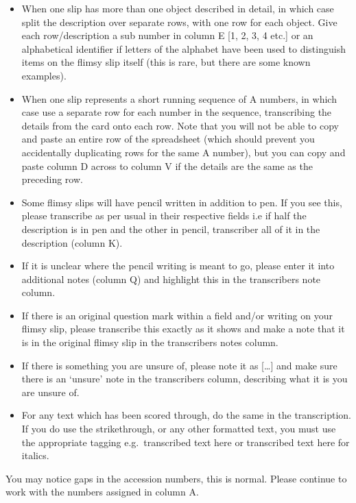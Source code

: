 \documentclass[
  openany]{book}
\providecommand{\tightlist}{%
  \setlength{\itemsep}{0pt}\setlength{\parskip}{0pt}}
\begin{document}
\begin{itemize}
\tightlist
\item
  When one slip has more than one object described in detail, in which case split the description over separate rows, with one row for each object. Give each row/description a sub number in column E {[}1, 2, 3, 4 etc.{]} or an alphabetical identifier if letters of the alphabet have been used to distinguish items on the flimsy slip itself (this is rare, but there are some known examples).
\item
  When one slip represents a short running sequence of A numbers, in which case use a separate row for each number in the sequence, transcribing the details from the card onto each row. Note that you will not be able to copy and paste an entire row of the spreadsheet (which should prevent you accidentally duplicating rows for the same A number), but you can copy and paste column D across to column V if the details are the same as the preceding row.
\item
  Some flimsy slips will have pencil written in addition to pen. If you see this, please transcribe as per usual in their respective fields i.e if half the description is in pen and the other in pencil, transcriber all of it in the description (column K).
\item
  If it is unclear where the pencil writing is meant to go, please enter it into additional notes (column Q) and highlight this in the transcribers note column.
\item
  If there is an original question mark within a field and/or writing on your flimsy slip, please transcribe this exactly as it shows and make a note that it is in the original flimsy slip in the transcribers notes column.
\item
  If there is something you are unsure of, please note it as {[}\ldots{]} and make sure there is an `unsure' note in the transcribers column, describing what it is you are unsure of.
\item
  For any text which has been scored through, do the same in the transcription. If you do use the strikethrough, or any other formatted text, you must use the appropriate tagging e.g.~transcribed text here or transcribed text here for italics.
\end{itemize}

You may notice gaps in the accession numbers, this is normal. Please continue to work with the numbers assigned in column A.
\end{document}
